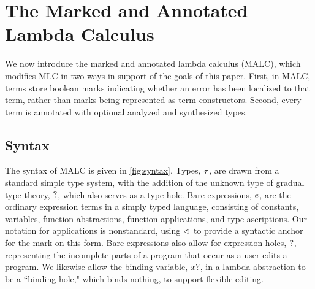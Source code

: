 
\section{The Marked and Annotated Lambda Calculus}
\label{sec:MALC}

We now introduce the marked and annotated lambda calculus (MALC), 
which modifies MLC in two ways in support of the goals of this paper. First, in MALC, terms store boolean marks indicating whether an error has been localized to that term, rather than marks being represented as term constructors. Second, every term is annotated with optional analyzed and synthesized types. 

\subsection{Syntax}
The syntax of MALC is given in \autoref{fig:syntax}. Types, $\tau$, are drawn from a standard simple type system, with the addition of the unknown type of gradual type theory, $?$, which also serves as a type hole. Bare expressions, $e$, are the ordinary expression terms in a simply typed language, consisting of constants, variables, function abstractions, function applications, and type ascriptions. Our notation for applications is nonstandard, using $\lhd$ to provide a syntactic anchor for the mark on this form. Bare expressions also allow for expression holes, $?$, representing the incomplete parts of a program that occur as a user edits a program. We likewise allow the binding variable, $x?$, in a lambda abstraction to be a ``binding hole," which binds nothing, to support flexible editing. 


